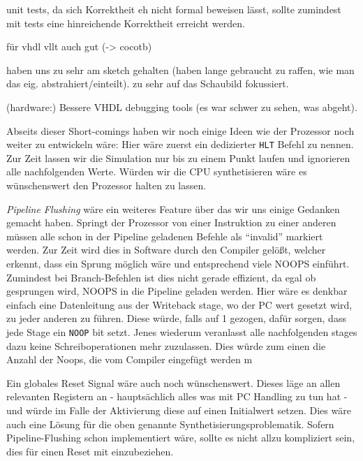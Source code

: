 \documentclass[paper=a4,fontsize=12pt,twocolumn]{scrreprt}
\begin{document}
unit tests, da sich Korrektheit eh nicht formal beweisen lässt, sollte zumindest mit tests eine hinreichende Korrektheit erreicht werden.

für vhdl vllt auch gut (-> cocotb)

haben uns zu sehr am sketch gehalten (haben lange gebraucht zu raffen, wie man das eig. abstrahiert/einteilt). zu sehr auf das Schaubild fokussiert.


(hardware:) Bessere VHDL debugging tools (es war schwer zu sehen, was abgeht).

Abseits dieser Short-comings haben wir noch einige Ideen wie der Prozessor noch weiter zu entwickeln wäre:
Hier wäre zuerst ein dedizierter \texttt{HLT} Befehl zu nennen.
Zur Zeit lassen wir die Simulation nur bis zu einem Punkt laufen und ignorieren alle nachfolgenden Werte.
Würden wir die CPU synthetisieren wäre es wünschenswert den Prozessor halten zu lassen.

\textit{Pipeline Flushing} wäre ein weiteres Feature über das wir uns einige Gedanken gemacht haben.
Springt der Prozessor von einer Instruktion zu einer anderen müssen alle schon in der Pipeline geladenen Befehle als \enquote{invalid} markiert werden.
Zur Zeit wird dies in Software durch den Compiler gelößt, welcher erkennt, dass ein Sprung möglich wäre und entsprechend viele NOOPS einführt.
Zumindest bei Branch-Befehlen ist dies nicht gerade effizient, da egal ob gesprungen wird, NOOPS in die Pipeline geladen werden.
Hier wäre es denkbar einfach eine Datenleitung aus der Writeback stage, wo der PC wert gesetzt wird, zu jeder anderen zu führen.
Diese würde, falls auf 1 gezogen, dafür sorgen, dass jede Stage ein \texttt{NOOP} bit setzt.
Jenes wiederum veranlasst alle nachfolgenden stages dazu keine Schreiboperationen mehr zuzulassen.
Dies würde zum einen die Anzahl der Noops, die vom Compiler eingefügt werden m

Ein globales Reset Signal wäre auch noch wünschenswert.
Dieses läge an allen relevanten Registern an - hauptsächlich alles was mit PC Handling zu tun hat - und würde im Falle der Aktivierung diese auf einen Initialwert setzen.
Dies wäre auch eine Lösung für die oben genannte Synthetisierungsproblematik.
Sofern Pipeline-Flushing schon implementiert wäre, sollte es nicht allzu kompliziert sein, dies für einen Reset mit einzubeziehen.
\end{document}
